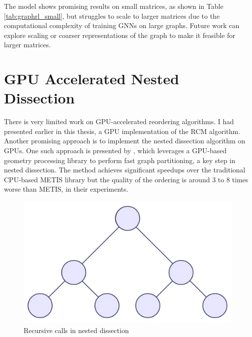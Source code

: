 The model shows promising results on small matrices, as shown in Table \ref{tab:graphrl_small}, but struggles to scale to larger matrices due to the computational complexity of training GNNs on large graphs. Future work can explore scaling or coarser representations of the graph to make it feasible for larger matrices.

\section{GPU Accelerated Nested Dissection}

There is very limited work on GPU-accelerated reordering algorithms. I had presented earlier in this thesis, a GPU implementation of the RCM algorithm. Another promising approach is to implement the nested dissection algorithm on GPUs. One such approach is presented by \cite{yuan_fast_nodate}, which leverages a GPU-based geometry processing library to perform fast graph partitioning, a key step in nested dissection. The method achieves significant speedups over the traditional CPU-based METIS library but the quality of the ordering is around 3 to 8 times worse than METIS, in their experiments.

\begin{figure}
\includegraphics[width=0.9\linewidth]{fig/background/nested_dissection.png} 
\caption{Recursive calls in nested dissection}
\label{fig:nd_res}
\end{figure}

